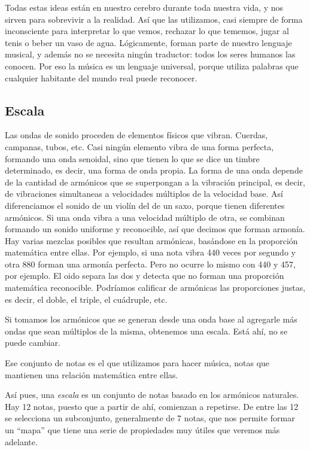 \documentclass[]{report}
\begin{document}
Todas estas ideas están en nuestro cerebro durante toda nuestra vida, y nos sirven para sobrevivir a la realidad. Así que las         utilizamos, casi siempre de forma inconsciente para interpretar lo que         vemos, rechazar lo que tememos, jugar al tenis o beber un vaso de         agua. Lógicamente, forman parte de nuestro lenguaje musical, y además         no se necesita ningún traductor: todos los seres humanos las conocen.         Por eso la música es un lenguaje universal, porque utiliza palabras         que cualquier habitante del mundo real puede reconocer.

\subsection{Escala}

Las ondas de sonido proceden de elementos físicos que vibran. Cuerdas, campanas, tubos, etc. Casi ningún elemento vibra de una forma perfecta, formando una onda senoidal, sino que tienen lo que se dice un timbre determinado, es decir, una forma de onda propia. La forma de una onda depende de la cantidad de armónicos que se superpongan a la vibración principal, es decir, de vibraciones simultaneas a velocidades múltiplos de la velocidad base. Así diferenciamos el sonido de un violín del de un saxo, porque tienen diferentes armónicos. Si una onda vibra a una velocidad múltiplo de otra, se combinan formando un sonido uniforme y reconocible, así que decimos que forman armonía. Hay varias mezclas posibles que resultan armónicas, basándose en la proporción matemática entre ellas. Por ejemplo, si una nota vibra 440 veces por segundo y otra 880 forman una armonía perfecta. Pero no ocurre lo mismo con 440 y 457, por ejemplo. El oido separa las dos y detecta que no forman una proporción matemática reconocible. Podríamos calificar de armónicas las proporciones justas, es decir, el doble, el triple, el cuádruple, etc.

Si tomamos los armónicos que se generan desde una onda base al agregarle más ondas que sean múltiplos de la misma, obtenemos una escala. Está ahí, no se puede cambiar.

Ese conjunto de notas es el que utilizamos para hacer música, notas que mantienen una relación matemática entre ellas.

Así pues, una \emph{escala} es un conjunto de notas basado en los armónicos naturales. Hay 12 notas, puesto que a partir de ahí, comienzan a repetirse. De entre las 12 se selecciona un subconjunto, generalmente de 7 notas, que nos permite formar un ``mapa'' que tiene una serie de propiedades muy útiles que veremos más adelante.
\end{document}
